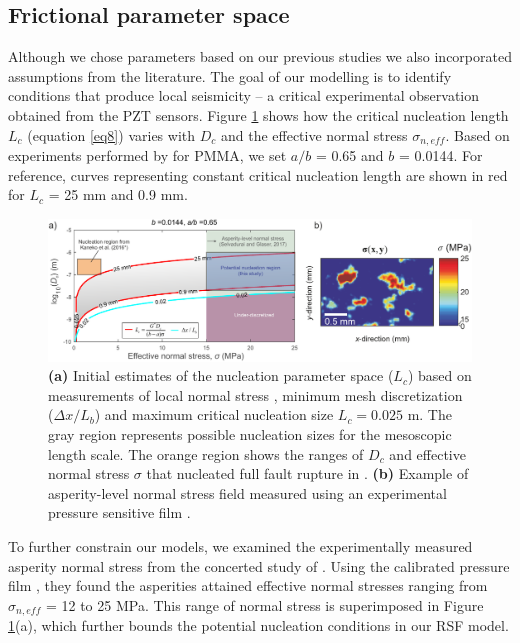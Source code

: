 \documentclass[preprint,1p, 10pt,authoryear]{elsarticle}
\begin{document}
\subsection{Frictional parameter space}
\label{ParameterSpace}
Although we chose parameters based on our previous studies we also incorporated assumptions from the literature. The goal of our modelling is to identify conditions that produce local seismicity -- a critical experimental observation obtained from the PZT sensors. Figure \ref{fig4} shows how the critical nucleation length $L_{c}$ (equation \eqref{eq8}) varies with $D_{c}$ and the effective normal stress $\sigma_{n,eff}$.  Based on experiments performed by \citet{Berthoude1999} for PMMA, we set $a/b$ = 0.65 and $b$ = 0.0144. For reference, curves representing constant critical nucleation length are shown in red for $L_{c}$ = 25 mm and 0.9 mm.   

\begin{figure}
	\centering
	\includegraphics[scale = 0.95]{FIG4.pdf} 
	\caption{\textbf{(a) }Initial estimates of the nucleation parameter space ($L_{c}$) based on measurements of local normal stress \citep{Selvadurai2017}, minimum mesh discretization ($\Delta x /L_{b}$) and maximum critical nucleation size $L_{c} = 0.025$ m. The gray region represents possible nucleation sizes for the mesoscopic length scale.  The orange region shows the ranges of $D_{c}$ and effective normal stress $\sigma$ that nucleated full fault rupture in \citet[][, *$a/b$ = 0.6944]{Kaneko2016}. \textbf{(b) }Example of asperity-level normal stress field measured using an experimental pressure sensitive film \citep[adapted from ][]{Selvadurai2017} \citet{Selvadurai2017}.}
	\label{fig4}
\end{figure}

To further constrain our models, we examined the experimentally measured asperity normal stress from the concerted study of \citet{Selvadurai2017}. Using the calibrated pressure film \citep{Selvadurai2015}, they found the asperities attained effective normal stresses ranging from $\sigma_{n,eff}$ = 12 to 25 MPa. This range of normal stress is superimposed in Figure \ref{fig4}(a), which further bounds the potential nucleation conditions in our RSF model.
\end{document}
